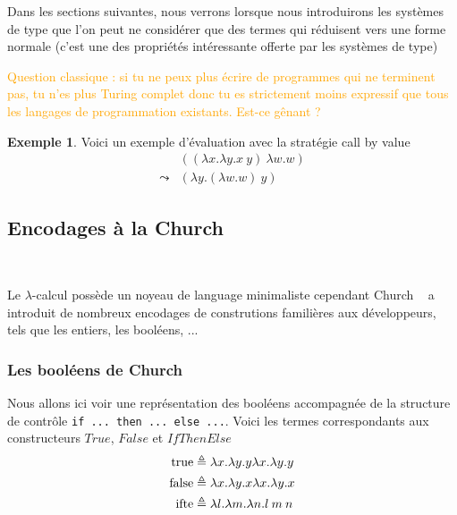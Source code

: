 \documentclass {article}
\theoremstyle{definition}
\newtheorem{example}{Exemple}
\theoremstyle{remark}
\newcommand{\attention}[1]{\textcolor{orange}{#1}}
\begin{document}
Dans les sections suivantes, nous verrons lorsque nous introduirons
les systèmes de type que l'on peut ne considérer que des termes qui
réduisent vers une forme normale (c'est une des propriétés
intéressante offerte par les systèmes de type)

\attention{Question classique : si tu ne peux plus écrire de
  programmes qui ne terminent pas, tu n'es plus Turing complet donc tu
  es strictement moins expressif que tous les langages de
  programmation existants. Est-ce gênant ?}

\begin{example}
  Voici un exemple d'évaluation avec la stratégie call by value
  \begin{align*}
    & ((\lambda x.\lambda y. x\: y)\: \lambda w.w)  \\
    \leadsto & (\lambda y. (\lambda w.w)\: y) 
  \end{align*}
\end{example}





\subsection{Encodages à la Church}

~\citet{church:lambda-calcul}

Le $\lambda$-calcul possède un noyeau de language minimaliste cependant 
Church ~\citet{church:lambda-calcul} a introduit de nombreux encodages de 
construtions familières aux développeurs, tels que les entiers,
les booléens, ...


\subsubsection{Les booléens de Church}

\newcommand{\True}{\ensuremath{\mathrm{true}}}
\newcommand{\False}{\ensuremath{\mathrm{false}}}
\newcommand{\Ifte}{\ensuremath{\mathrm{ifte}}}

Nous allons ici voir une représentation des booléens accompagnée de la 
structure de contrôle \texttt{if ... then ... else ...}.
Voici les termes correspondants aux constructeurs $True$, $False$ et 
$IfThenElse$
\begin{align*}
  \True &\triangleq \lambda x.\lambda y. y  \Lam{x}{\Lam{y}{\Var{y}}} \\
  \False &\triangleq \lambda x.\lambda y. x \Lam{x}{\Lam{y}{\Var{x}}} \\
  \Ifte &\triangleq \Lam{l}{\Lam{m}{\Lam{n}{\App{\Var{l}}{\App{\Var{m}}{\Var{n}}}}}}  \\
\end{align*}
\end{document}
